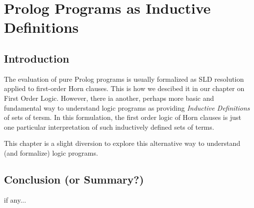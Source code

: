 \chapter{Prolog Programs as Inductive Definitions}

\section{Introduction}
The evaluation of pure Prolog programs is usually formalized as SLD
resolution applied to first-order Horn clauses.  This is how we
descibed it in our chapter on First Order Logic.  However, there ia
another, perhaps more basic and fundamental way to understand logic
programs as providing {\em Inductive Definitions} of sets of tersm.
In this formulation, the first order logic of Horn clauses is just one
particular interpretation of such inductively defined sets of terms.

This chapter is a slight diversion to explore this alternative way to
understand (and formalize) logic programs.

\section{Conclusion (or Summary?)}
if any...
